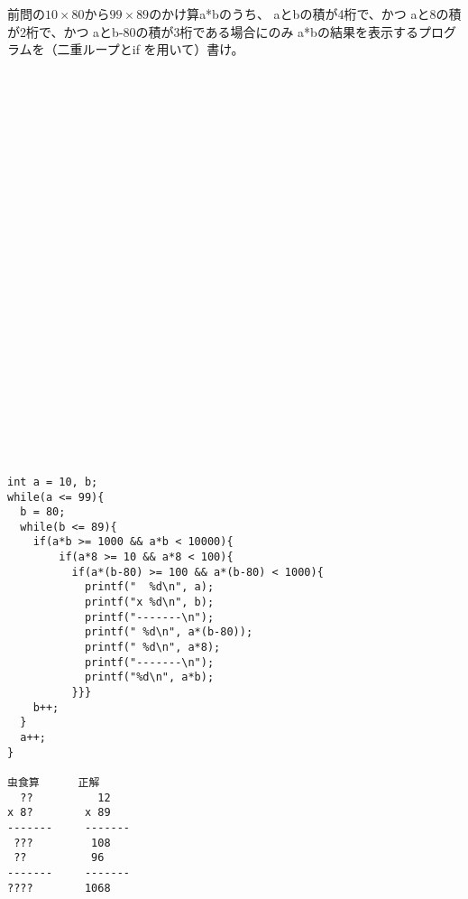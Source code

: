 \documentclass[a4j]{jarticle}
\begin{document}
\begin{multicols*}{2}
前問の$10\times80$から$99\times89$のかけ算{\ttfamily a*b}のうち、
{\ttfamily aとb}の積が4桁で、かつ
{\ttfamily aと8}の積が2桁で、かつ
{\ttfamily aとb-80}の積が3桁である場合にのみ
{\ttfamily a*b}の結果を表示するプログラムを（二重ループと{\ttfamily if}
を用いて）書け。


\ifnum {}
\begin{verbatim}



























\end{verbatim}
\else
\begin{verbatim}
int a = 10, b;
while(a <= 99){
  b = 80;
  while(b <= 89){
    if(a*b >= 1000 && a*b < 10000){
        if(a*8 >= 10 && a*8 < 100){
          if(a*(b-80) >= 100 && a*(b-80) < 1000){
            printf("  %d\n", a);
            printf("x %d\n", b);
            printf("-------\n");
            printf(" %d\n", a*(b-80));
            printf(" %d\n", a*8);
            printf("-------\n");
            printf("%d\n", a*b);
          }}}
    b++;
  }
  a++;
}

虫食算      正解
  ??          12   
x 8?        x 89   
-------     -------
 ???         108   
 ??          96    
-------     -------
????        1068   
\end{verbatim}
\vfill
\mbox{}
\fi






%
%
%
%
%
%
%
%
%
%
%
%
%
%
%





\end{multicols*}
\end{document}
